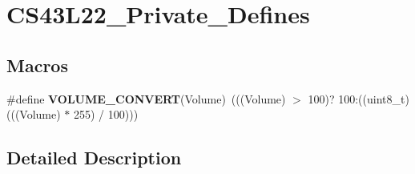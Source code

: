 \hypertarget{group___c_s43_l22___private___defines}{}\section{C\+S43\+L22\+\_\+\+Private\+\_\+\+Defines}
\label{group___c_s43_l22___private___defines}
\subsection*{Macros}
\begin{DoxyCompactItemize}
\item 
\mbox{\label{group___c_s43_l22___private___defines_ga2688a5c60d4f8f7edb404255fb0a0573}} 
\#define {\bfseries V\+O\+L\+U\+M\+E\+\_\+\+C\+O\+N\+V\+E\+RT}(Volume)~(((Volume) $>$ 100)? 100\+:((uint8\+\_\+t)(((Volume) $\ast$ 255) / 100)))
\end{DoxyCompactItemize}


\subsection{Detailed Description}
